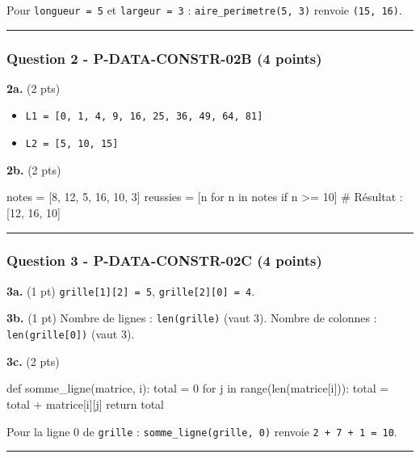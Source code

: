 Pour \texttt{longueur\ =\ 5} et \texttt{largeur\ =\ 3} :
\texttt{aire\_perimetre(5,\ 3)} renvoie \texttt{(15,\ 16)}.

\begin{center}\rule{0.5\linewidth}{0.5pt}\end{center}

\subsubsection{Question 2 - P-DATA-CONSTR-02B (4 points)}

\textbf{2a.} (2 pts)

\begin{itemize}
\tightlist
\item
  \texttt{L1\ =\ {[}0,\ 1,\ 4,\ 9,\ 16,\ 25,\ 36,\ 49,\ 64,\ 81{]}}
\item
  \texttt{L2\ =\ {[}5,\ 10,\ 15{]}}
\end{itemize}

\textbf{2b.} (2 pts)

\begin{python}
notes = [8, 12, 5, 16, 10, 3]
reussies = [n for n in notes if n >= 10]
# Résultat : [12, 16, 10]
\end{python}

\begin{center}\rule{0.5\linewidth}{0.5pt}\end{center}

\subsubsection{Question 3 - P-DATA-CONSTR-02C (4 points)}

\textbf{3a.} (1 pt) \texttt{grille{[}1{]}{[}2{]}\ =\ 5},
\texttt{grille{[}2{]}{[}0{]}\ =\ 4}.

\textbf{3b.} (1 pt) Nombre de lignes : \texttt{len(grille)} (vaut 3).
Nombre de colonnes : \texttt{len(grille{[}0{]})} (vaut 3).

\textbf{3c.} (2 pts)

\begin{python}
def somme_ligne(matrice, i):
    total = 0
    for j in range(len(matrice[i])):
        total = total + matrice[i][j]
    return total
\end{python}

Pour la ligne 0 de \texttt{grille} : \texttt{somme\_ligne(grille,\ 0)}
renvoie \texttt{2\ +\ 7\ +\ 1\ =\ 10}.

\begin{center}\rule{0.5\linewidth}{0.5pt}\end{center}

